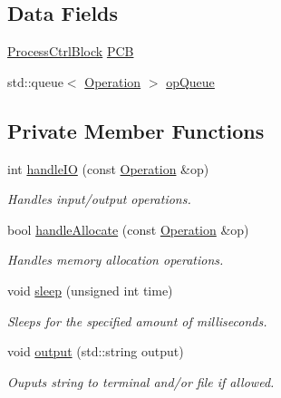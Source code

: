 \subsection*{Data Fields}
\begin{DoxyCompactItemize}
\item 
\hyperlink{struct_process_ctrl_block}{Process\+Ctrl\+Block} \hyperlink{class_application_a70949b46aa0b4fd18ef9f0eb5ae3ff29}{P\+CB}
\item 
std\+::queue$<$ \hyperlink{struct_operation}{Operation} $>$ \hyperlink{class_application_a5b4ee9982980b3800888d69c06495695}{op\+Queue}
\end{DoxyCompactItemize}
\subsection*{Private Member Functions}
\begin{DoxyCompactItemize}
\item 
int \hyperlink{class_application_a67ca128f61272b41cd1dfbaabc545414}{handle\+IO} (const \hyperlink{struct_operation}{Operation} \&op)
\begin{DoxyCompactList}\small\item\em Handles input/output operations. \end{DoxyCompactList}\item 
bool \hyperlink{class_application_a01f7245a18db9aaa29b6aa70378f5268}{handle\+Allocate} (const \hyperlink{struct_operation}{Operation} \&op)
\begin{DoxyCompactList}\small\item\em Handles memory allocation operations. \end{DoxyCompactList}\item 
void \hyperlink{class_application_a5e91885cbf2538d31c447e669a83fd4e}{sleep} (unsigned int time)
\begin{DoxyCompactList}\small\item\em Sleeps for the specified amount of milliseconds. \end{DoxyCompactList}\item 
void \hyperlink{class_application_a7e4c67727947c166a9568eff2fa4faa8}{output} (std\+::string output)
\begin{DoxyCompactList}\small\item\em Ouputs string to terminal and/or file if allowed. \end{DoxyCompactList}\end{DoxyCompactItemize}
